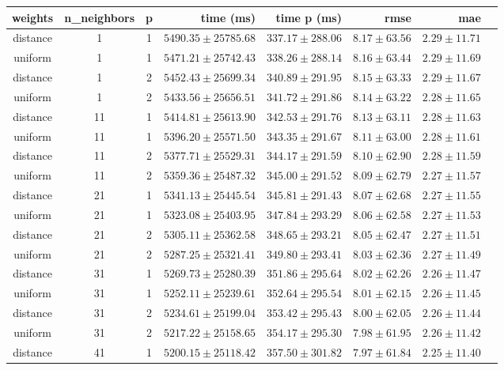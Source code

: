 \begin{tabular}{cccrrrrr}
\toprule
\textbf{weights} & \textbf{n\_neighbors} & \textbf{p} & \textbf{time (ms)} & \textbf{time p (ms)} & \textbf{rmse} & \textbf{mae}\\
\midrule
distance & 1 & 1 & $5490.35 \pm 25785.68$ & $337.17 \pm 288.06$ & $8.17 \pm 63.56$ & $2.29 \pm 11.71$\\
uniform & 1 & 1 & $5471.21 \pm 25742.43$ & $338.26 \pm 288.14$ & $8.16 \pm 63.44$ & $2.29 \pm 11.69$\\
distance & 1 & 2 & $5452.43 \pm 25699.34$ & $340.89 \pm 291.95$ & $8.15 \pm 63.33$ & $2.29 \pm 11.67$\\
uniform & 1 & 2 & $5433.56 \pm 25656.51$ & $341.72 \pm 291.86$ & $8.14 \pm 63.22$ & $2.28 \pm 11.65$\\
distance & 11 & 1 & $5414.81 \pm 25613.90$ & $342.53 \pm 291.76$ & $8.13 \pm 63.11$ & $2.28 \pm 11.63$\\
uniform & 11 & 1 & $5396.20 \pm 25571.50$ & $343.35 \pm 291.67$ & $8.11 \pm 63.00$ & $2.28 \pm 11.61$\\
distance & 11 & 2 & $5377.71 \pm 25529.31$ & $344.17 \pm 291.59$ & $8.10 \pm 62.90$ & $2.28 \pm 11.59$\\
uniform & 11 & 2 & $5359.36 \pm 25487.32$ & $345.00 \pm 291.52$ & $8.09 \pm 62.79$ & $2.27 \pm 11.57$\\
distance & 21 & 1 & $5341.13 \pm 25445.54$ & $345.81 \pm 291.43$ & $8.07 \pm 62.68$ & $2.27 \pm 11.55$\\
uniform & 21 & 1 & $5323.08 \pm 25403.95$ & $347.84 \pm 293.29$ & $8.06 \pm 62.58$ & $2.27 \pm 11.53$\\
distance & 21 & 2 & $5305.11 \pm 25362.58$ & $348.65 \pm 293.21$ & $8.05 \pm 62.47$ & $2.27 \pm 11.51$\\
uniform & 21 & 2 & $5287.25 \pm 25321.41$ & $349.80 \pm 293.41$ & $8.03 \pm 62.36$ & $2.27 \pm 11.49$\\
distance & 31 & 1 & $5269.73 \pm 25280.39$ & $351.86 \pm 295.64$ & $8.02 \pm 62.26$ & $2.26 \pm 11.47$\\
uniform & 31 & 1 & $5252.11 \pm 25239.61$ & $352.64 \pm 295.54$ & $8.01 \pm 62.15$ & $2.26 \pm 11.45$\\
distance & 31 & 2 & $5234.61 \pm 25199.04$ & $353.42 \pm 295.43$ & $8.00 \pm 62.05$ & $2.26 \pm 11.44$\\
uniform & 31 & 2 & $5217.22 \pm 25158.65$ & $354.17 \pm 295.30$ & $7.98 \pm 61.95$ & $2.26 \pm 11.42$\\
distance & 41 & 1 & $5200.15 \pm 25118.42$ & $357.50 \pm 301.82$ & $7.97 \pm 61.84$ & $2.25 \pm 11.40$\\

\end{tabular}
